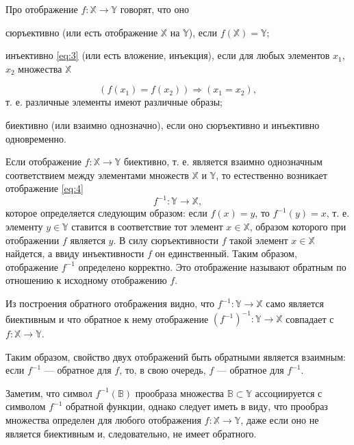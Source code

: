 Про отображение $f\colon \mathbb{X} \to \mathbb{Y}$ говорят, что оно

сюръективно (или есть отображение $\mathbb{X}$ на $\mathbb{Y}$), если $f(\mathbb{X})=\mathbb{Y}$;

инъективно \eqref{eq:3} (или есть вложение, инъекция), если для любых элементов $x_1$, $x_2$ множества $\mathbb{X}$

\begin{equation}
\label{eq:3}
(f(x_1)=f(x_2)) \Rightarrow (x_1=x_2),
\end{equation}
т. е. различные элементы имеют различные образы;

биективно (или взаимно однозначно), если оно сюръективно и инъективно одновременно.

Если отображение $f\colon \mathbb{X} \to \mathbb{Y}$ биективно, т. е. является взаимно однозначным соответствием между элементами множеств $\mathbb{X}$ и $\mathbb{Y}$, то естественно возникает отображение \eqref{eq:4}
\begin{equation}
\label{eq:4}
f^{-1}\colon \mathbb{Y} \to \mathbb{X},
\end{equation}
которое определяется следующим образом: если $f(x)=y$, то $f^{-1}(y)=x$, т. е.
элементу $y \in \mathbb{Y}$ ставится в соответствие тот элемент $x \in \mathbb{X}$, образом которого при отображении $f$ является $y$. В силу сюръективности $f$ такой элемент
$x \in \mathbb{X}$ найдется, а ввиду инъективности $f$ он единственный. Таким образом,
отображение $f^{-1}$ определено корректно. Это отображение называют обратным по отношению к исходному отображению $f$.

Из построения обратного отображения видно, что $f^{-1}\colon \mathbb{Y} \to \mathbb{X}$ само является биективным и что обратное к нему отображение $(f^{-1})^{-1}\colon \mathbb{Y} \to \mathbb{X}$ совпадает с $f\colon \mathbb{X} \to \mathbb{Y}$.

Таким образом, свойство двух отображений быть обратными является
взаимным: если $f^{-1}$ — обратное для $f$, то, в свою очередь, $f$ — обратное
для $f^{-1}$.

Заметим, что символ $f^{-1}(\mathbb{B})$ прообраза множества $\mathbb{B} \subset \mathbb{Y}$ ассоциируется с
символом $f^{-1}$ обратной функции, однако следует иметь в виду, что прообраз
множества определен для любого отображения $f\colon \mathbb{X} \to \mathbb{Y}$, даже если оно не
является биективным и, следовательно, не имеет обратного.


